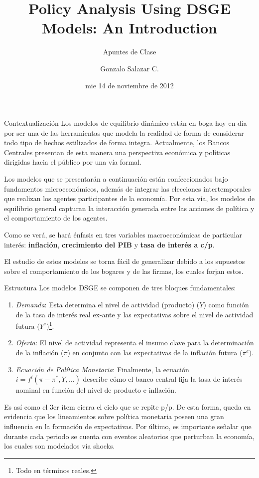 \documentclass{beamer}
\title{Policy Analysis Using DSGE Models: An Introduction}
\subtitle{Apuntes de Clase}
\author{Gonzalo Salazar C. }
\date{mie 14 de noviembre de 2012}
\begin{document}
\frame{\titlepage}


\begin{frame}{Contextualizaci\'on}
Los modelos de equilibrio din\'amico est\'an en boga hoy en d\'ia por ser una de las herramientas que modela la realidad de forma de considerar todo tipo de hechos estilizados de forma integra. Actualmente, los Bancos Centrales presentan de esta manera una perspectiva econ\'omica y pol\'iticas dirigidas hacia el p\'ublico por una v\'ia formal.

\medskip
Los modelos que se presentar\'an a continuaci\'on est\'an confeccionados bajo fundamentos microecon\'omicos, adem\'as de integrar las elecciones intertemporales que realizan los agentes participantes de la econom\'ia. Por esta v\'ia, los modelos de equilibrio general capturan la interacci\'on generada entre las acciones de pol\'itica y el comportamiento de los agentes.

\medskip
Como se ver\'a, se har\'a \'enfasis en tres variables macroecon\'omicas de particular inter\'es: \textbf{inflaci\'on}, \textbf{crecimiento del PIB} y \textbf{tasa de inter\'es a c/p}.

\medskip
El estudio de estos modelos se torna f\'acil de generalizar debido a los supuestos sobre el comportamiento de los bogares y de las firmas, los cuales forjan estos.
\end{frame}

\begin{frame}{Estructura}
Los modelos DSGE se componen de tres bloques fundamentales:
\begin{enumerate}
\item{\emph{Demanda}: Esta determina el nivel de actividad (producto) ($Y$) como funci\'on de la tasa de inter\'es real ex-ante y las expectativas sobre el nivel de actividad futura ($Y^{e}$)\footnote{Todo en t\'erminos reales.}.}
\item{\emph{Oferta}: El nivel de actividad representa el insumo clave para la determinaci\'on de la inflaci\'on ($\pi$) en conjunto con las expectativas de la inflaci\'on futura ($\pi^{e}$).}
\item{\emph{Ecuaci\'on de Pol\'itica Monetaria}: Finalmente, la ecuaci\'on $i=f^{i}(\pi-\pi^{*}, Y,\ldots)$ describe c\'omo el banco central fija la tasa de inter\'es nominal en funci\'on del nivel de producto e inflaci\'on.}
\end{enumerate}

Es as\'i como el 3er \'item cierra el ciclo que se repite p/p. De esta forma, queda en evidencia que los lineamientos sobre pol\'itica monetaria poseen una gran influencia en la formaci\'on de expectativas. Por \'ultimo, es importante se\~nalar que durante cada periodo se cuenta con eventos aleatorios que perturban la econom\'ia, los cuales son modelados v\'ia shocks.
\end{frame}
\end{document}
